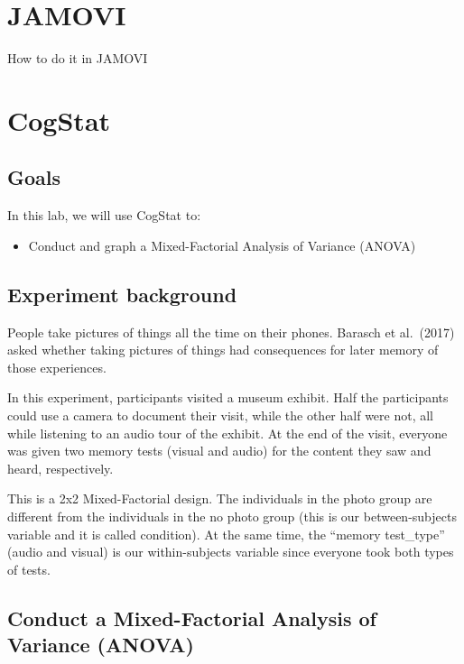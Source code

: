 \documentclass[
]{book}
\providecommand{\tightlist}{%
  \setlength{\itemsep}{0pt}\setlength{\parskip}{0pt}}
\begin{document}
\hypertarget{jamovi-11}{%
\section{JAMOVI}\label{jamovi-11}}

How to do it in JAMOVI

\hypertarget{cogstat-12}{%
\section{CogStat}\label{cogstat-12}}

\hypertarget{goals-10}{%
\subsection{Goals}\label{goals-10}}

In this lab, we will use CogStat to:

\begin{itemize}
\tightlist
\item
  Conduct and graph a Mixed-Factorial Analysis of Variance (ANOVA)
\end{itemize}

\hypertarget{experiment-background-11}{%
\subsection{Experiment background}\label{experiment-background-11}}

People take pictures of things all the time on their phones. Barasch et al.~(2017) asked whether taking pictures of things had consequences for later memory of those experiences.

In this experiment, participants visited a museum exhibit. Half the participants could use a camera to document their visit, while the other half were not, all while listening to an audio tour of the exhibit. At the end of the visit, everyone was given two memory tests (visual and audio) for the content they saw and heard, respectively.

This is a 2x2 Mixed-Factorial design. The individuals in the photo group are different from the individuals in the no photo group (this is our between-subjects variable and it is called condition). At the same time, the ``memory test\_type'' (audio and visual) is our within-subjects variable since everyone took both types of tests.

\hypertarget{conduct-a-mixed-factorial-analysis-of-variance-anova-1}{%
\subsection{Conduct a Mixed-Factorial Analysis of Variance (ANOVA)}\label{conduct-a-mixed-factorial-analysis-of-variance-anova-1}}
\end{document}
